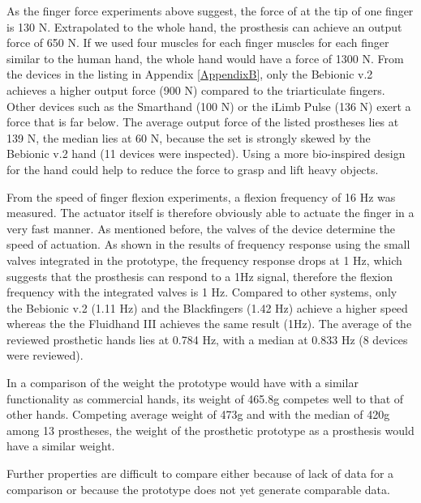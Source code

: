 \documentclass[main]{subfiles}
\begin{document}
As the finger force experiments above suggest, the force of at the tip of one finger is 130 N. Extrapolated to the whole hand, the prosthesis can achieve an output force of 650 N. If we used four muscles for each finger muscles for each finger similar to the human hand, the whole hand would have a force of 1300 N.  From the devices in the listing in Appendix \ref{AppendixB}, only the Bebionic v.2 achieves a higher output force (900 N) compared to the triarticulate fingers. Other devices such as the Smarthand (100 N) or the iLimb Pulse (136 N) exert a force that is far below. The average output force of the listed prostheses lies at 139 N, the median lies at 60 N, because the set is strongly skewed by the Bebionic v.2 hand (11 devices were inspected). Using a more bio-inspired design for the hand could help to reduce the force to grasp and lift heavy objects.

From the speed of finger flexion experiments, a flexion frequency of 16 Hz was measured. The actuator itself is therefore obviously able to actuate the finger in a very fast manner. As mentioned before, the valves of the device determine the speed of actuation. As shown in the results of frequency response using the small valves integrated in the prototype, the frequency response drops at 1 Hz, which suggests that the prosthesis can respond to a 1Hz signal, therefore the flexion frequency with the integrated valves is 1 Hz. Compared to other systems, only the Bebionic v.2 (1.11 Hz) and the Blackfingers (1.42 Hz) achieve a higher speed whereas the the Fluidhand III achieves the same result (1Hz). The average of the reviewed prosthetic hands lies at 0.784 Hz, with a median at 0.833 Hz (8 devices were reviewed).

In a comparison of the weight the prototype would have with a similar functionality as commercial hands, its weight of 465.8g competes well to that of other hands. Competing average weight of 473g and with the median of 420g among 13 prostheses, the weight of the prosthetic prototype as a prosthesis would have a similar weight. 

Further properties are difficult to compare either because of lack of data for a comparison or because the prototype does not yet generate comparable data.
\end{document}

